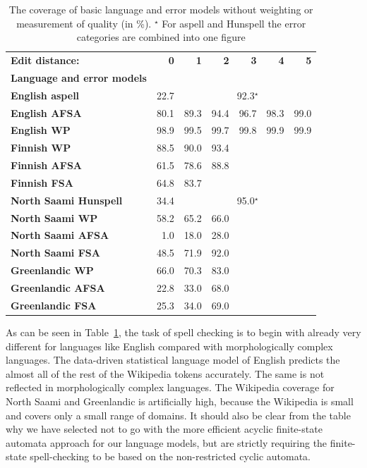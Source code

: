 \documentclass[a4paper,12pt]{article}
\begin{document}
\begin{table}
    \centering
    \begin{tabular}{|l|r|r|r|r|r|r|}
        \hline
        \bf Edit distance: & \bf 0  & \bf 1 & \bf 2 & \bf 3 & \bf 4 & \bf 5 \\
        \bf Language and error models &   &  &  &  &  &  \\
        \hline
    \bf English aspell & 22.7 & \multicolumn{5}{|c|}{92.3$^\star$}  \\
        \bf English AFSA   & 80.1 & 89.3 & 94.4 & 96.7 & 98.3 & 99.0 \\
            \bf English WP & 98.9 & 99.5 & 99.7 & 99.8 & 99.9 & 99.9 \\
        \hline
                   \bf Finnish WP  & 88.5 & 90.0 & 93.4 & & & \\
                  \bf Finnish AFSA & 61.5 & 78.6 & 88.8 & & & \\
                  \bf Finnish FSA  & 64.8 & 83.7 & & & & \\
        \hline
        \bf North Saami Hunspell & 34.4 & \multicolumn{5}{|c|}{95.0$^\star$} \\
        \bf North Saami WP & 58.2 & 65.2 & 66.0 & & & \\
               \bf North Saami AFSA & 1.0 & 18.0 & 28.0 & & & \\
               \bf North Saami FSA & 48.5 & 71.9 & 92.0 & & & \\
        \hline
        \bf Greenlandic WP            & 66.0 & 70.3 & 83.0 & & & \\
                 \bf Greenlandic AFSA & 22.8 & 33.0 & 68.0 & & & \\
                  \bf Greenlandic FSA & 25.3 & 34.0 & 69.0 & & & \\
        \hline
    \end{tabular}
    \caption{The coverage of basic language and error models without weighting
        or measurement of quality (in \%).
    $^\star$ For aspell and Hunspell the error categories are combined into one
    figure\label{table:coverage}}
\end{table}

As can be seen in Table~\ref{table:coverage}, the task of spell checking is to
begin with already very different for languages like English compared
with morphologically complex languages. The data-driven statistical language
model of English predicts the almost all of the rest of the Wikipedia tokens
accurately. The same is not reflected in morphologically complex languages.
The Wikipedia coverage for North Saami and Greenlandic is artificially high,
because the Wikipedia is small and covers only a small range of domains.
It
should also be clear from the table why we have selected not to go with the
more efficient acyclic finite-state automata approach for our language models,
but are strictly requiring the finite-state spell-checking to be based on the
non-restricted cyclic automata.
\end{document}
